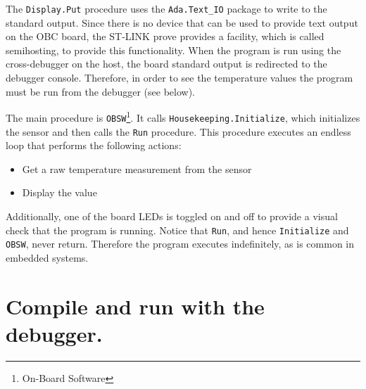 The {\tt Display.Put} procedure uses the {\tt Ada.Text\_IO} package to write to the standard output.  Since there is no device that can be used to provide text output on the OBC board, the ST-LINK prove provides a facility, which is called semihosting, to provide this functionality. When the program is run using the cross-debugger on the host, the board standard output is redirected to the debugger console. Therefore, in order to see the temperature values the program must be run from the debugger (see below).

The main procedure is {\tt OBSW}\footnote{On-Board Software}. It calls {\tt Housekeeping.Initialize}, which initializes the sensor and then calls the {\tt Run} procedure. This procedure executes an endless loop that performs the following actions:
\begin{itemize}
\item Get a raw temperature measurement from the sensor
\item Display the value
\end{itemize}

Additionally, one of the board LEDs is toggled on and off to provide a visual check that the program is running.
Notice that {\tt Run}, and hence {\tt Initialize} and {\tt OBSW}, never return. Therefore the program executes indefinitely, as is common in embedded systems.

\section{Compile and run with the debugger.}


